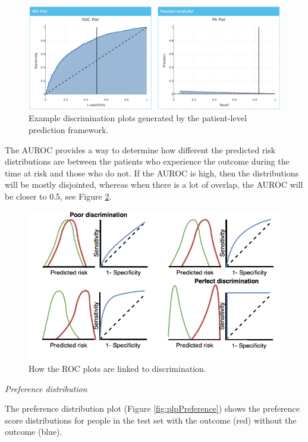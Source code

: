 \documentclass[11pt]{book}
\theoremstyle{definition}
\theoremstyle{definition}
\theoremstyle{definition}
\theoremstyle{remark}
\begin{document}
\begin{figure}
\includegraphics[width=1\linewidth]{images/PatientLevelPrediction/theory/discrimination} \caption{Example discrimination plots generated by the patient-level prediction framework.}\label{fig:figuretheoryroc}
\end{figure}

The AUROC provides a way to determine how different the predicted risk distributions are between the patients who experience the outcome during the time at risk and those who do not. If the AUROC is high, then the distributions will be mostly disjointed, whereas when there is a lot of overlap, the AUROC will be closer to 0.5, see Figure \ref{fig:figuretheoryroctheory}.

\begin{figure}
\includegraphics[width=1\linewidth]{images/PatientLevelPrediction/theory/roctheory} \caption{How the ROC plots are linked to discrimination.}\label{fig:figuretheoryroctheory}
\end{figure}

\emph{Preference distribution}

The preference distribution plot (Figure \ref{fig:plpPreference}) shows the preference score distributions for people in the test set with the outcome (red) without the outcome (blue).
\end{document}
